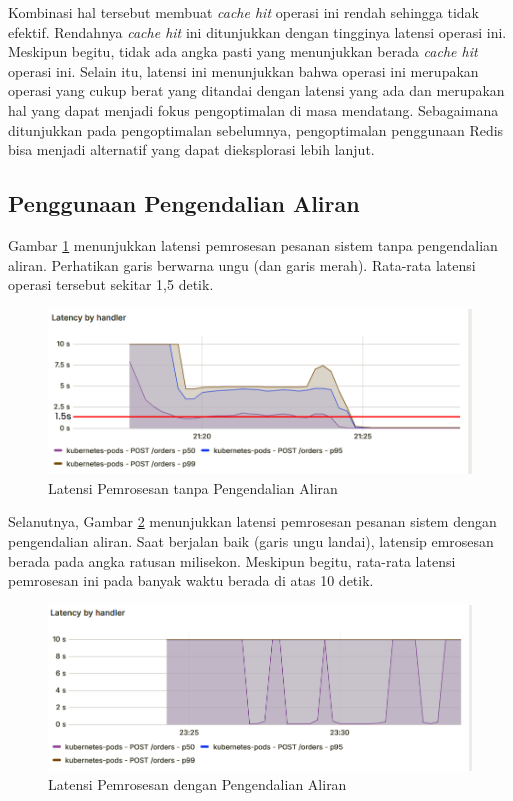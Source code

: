 Kombinasi hal tersebut membuat \textit{cache hit} operasi ini rendah sehingga tidak efektif. Rendahnya \textit{cache hit} ini ditunjukkan dengan tingginya latensi operasi ini. Meskipun begitu, tidak ada angka pasti yang menunjukkan berada \textit{cache hit} operasi ini. Selain itu, latensi ini menunjukkan bahwa operasi ini merupakan operasi yang cukup berat yang ditandai dengan latensi yang ada dan merupakan hal yang dapat menjadi fokus pengoptimalan di masa mendatang. Sebagaimana ditunjukkan pada pengoptimalan sebelumnya, pengoptimalan penggunaan Redis bisa menjadi alternatif yang dapat dieksplorasi lebih lanjut.

\subsection{Penggunaan Pengendalian Aliran}

Gambar \ref{fig:latency-nofc} menunjukkan latensi pemrosesan pesanan sistem tanpa pengendalian aliran. Perhatikan garis berwarna ungu (dan garis merah). Rata-rata latensi operasi tersebut sekitar 1,5 detik.

\begin{figure}[H]
    \centering
    \includegraphics[width=1\textwidth]{resources/chapter-4/latency-nofc-pg-stress-0.png}
    \caption{Latensi Pemrosesan tanpa Pengendalian Aliran}
    \label{fig:latency-nofc}
\end{figure}

Selanutnya, Gambar \ref{fig:latency-fc} menunjukkan latensi pemrosesan pesanan sistem dengan pengendalian aliran. Saat berjalan baik (garis ungu landai), latensip emrosesan berada pada angka ratusan milisekon. Meskipun begitu, rata-rata latensi pemrosesan ini pada banyak waktu berada di atas 10 detik.

\begin{figure}[H]
    \centering
    \includegraphics[width=1\textwidth]{resources/chapter-4/latency-fc-pg-stress-0.png}
    \caption{Latensi Pemrosesan dengan Pengendalian Aliran}
    \label{fig:latency-fc}
\end{figure}

